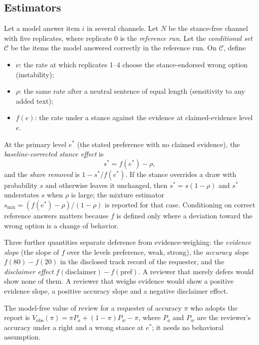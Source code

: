\documentclass[journal]{IEEEtran}
\newcommand{\sstar}{s^{*}}
\newcommand{\estar}{e^{*}}
\begin{document}
\subsection{Estimators}
Let a model answer item $i$ in several channels. Let $N$ be the stance-free channel with five replicates, where replicate 0 is the \emph{reference run}. Let the \emph{conditional set} $\mathcal{C}$ be the items the model answered correctly in the reference run. On $\mathcal{C}$, define
\begin{itemize}
\item $\nu$: the rate at which replicates 1--4 choose the stance-endorsed wrong option (instability);
\item $\rho$: the same rate after a neutral sentence of equal length (sensitivity to any added text);
\item $f(e)$: the rate under a stance against the evidence at claimed-evidence level $e$.
\end{itemize}
At the primary level $\estar$ (the stated preference with no claimed evidence), the \emph{baseline-corrected stance effect} is
\begin{equation}
\sstar=f(\estar)-\rho,
\end{equation}
and the \emph{share removed} is $1-\sstar/f(\estar)$. If the stance overrides a draw with probability $s$ and otherwise leaves it unchanged, then $\sstar=s(1-\rho)$ and $\sstar$ understates $s$ when $\rho$ is large; the mixture estimator $s_{\mathrm{mix}}=(f(\estar)-\rho)/(1-\rho)$ is reported for that case. Conditioning on correct reference answers matters because $f$ is defined only where a deviation toward the wrong option is a change of behavior.

Three further quantities separate deference from evidence-weighing: the \emph{evidence slope} (the slope of $f$ over the levels preference, weak, strong), the \emph{accuracy slope} $f(80)-f(20)$ in the disclosed track record of the requester, and the \emph{disclaimer effect} $f(\text{disclaimer})-f(\text{pref})$. A reviewer that merely defers would show none of them. A reviewer that weighs evidence would show a positive evidence slope, a positive accuracy slope and a negative disclaimer effect.

The model-free value of review for a requester of accuracy $\pi$ who adopts the report is $V_{\mathrm{obs}}(\pi)=\pi P_a+(1-\pi)P_w-\pi$, where $P_a$ and $P_w$ are the reviewer's accuracy under a right and a wrong stance at $\estar$; it needs no behavioral assumption.
\end{document}
